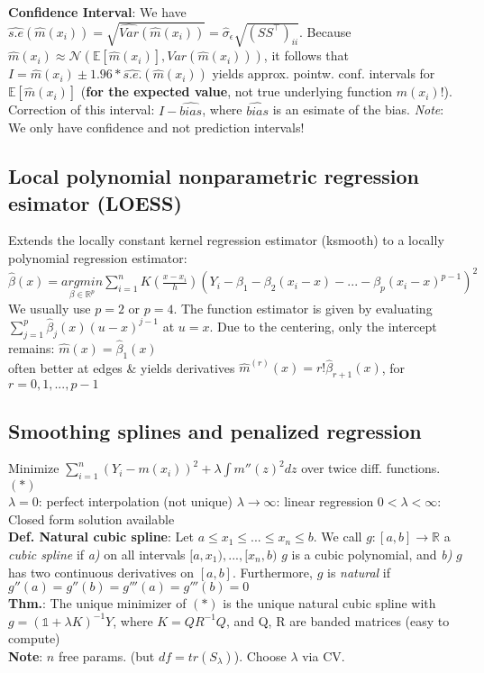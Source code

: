 \textbf{Confidence Interval}: We have $\widehat{s.e}(\hat{m}(x_i))=\sqrt{\widehat{Var}(\hat{m}(x_i))}=\hat\sigma_\epsilon\sqrt{(SS^\intercal )_{ii}}$. Because $\hat{m}(x_i) \approx \mathcal{N}(\mathbb{E}[\hat{m}(x_i)], Var(\hat{m}(x_i)))$, it follows that \\ 
$I = \hat{m}(x_i) \pm 1.96*\widehat{s.e.}(\hat{m}(x_i))$ yields approx. pointw. conf. intervals for $\mathbb{E}[\hat{m}(x_i)]$ (\textbf{for the expected value}, not true underlying function $m(x_i)$!). Correction of this interval: $I - \widehat{bias}$, where $\widehat{bias}$ is an esimate of the bias. \emph{Note}: We only have confidence and not prediction intervals!

\subsection*{Local polynomial nonparametric regression esimator (LOESS)}
Extends the locally constant kernel regression estimator (ksmooth) to a locally polynomial regression estimator:\\ 
$\hat{\beta}(x) = \underset{\beta \in \mathbb{R}^p}{argmin}\sum_{i=1}^n K\left(\frac{x-x_i}{h}\right)\left(Y_i - \beta_1 - \beta_2(x_i-x) - ... - \beta_p(x_i-x)^{p-1} \right)^2$ We usually use $p=2$ or $p=4$. The function estimator is given by evaluating $\sum_{j=1}^p \hat{\beta}_j(x)(u-x)^{j-1}$ at $u=x$. Due to the centering, only the intercept remains: $\hat{m}(x) = \hat{\beta}_1(x)$ \\
\textrightarrow often better at edges \& yields derivatives $\hat{m}^{(r)}(x) = r!\hat{\beta}_{r+1}(x)$, for $r=0,1,...,p-1$

\subsection*{Smoothing splines and penalized regression}
Minimize $\sum_{i=1}^n(Y_i-m(x_i))^2 + \lambda \int m''(z)^2dz$ over twice diff. functions. $(*)$\\
\textrightarrow $\lambda = 0$: perfect interpolation (not unique)
\textrightarrow $\lambda \to \infty$: linear regression
\textrightarrow $0 < \lambda < \infty$: Closed form solution available \\
\textbf{Def. Natural cubic spline}: Let $a \leq x_1 \leq ... \leq x_n \leq b.$ We call $g: [a, b] \to \mathbb{R}$ a \emph{cubic spline} if \emph{a)} on all intervals $[a, x_1), ...,[x_n, b)$ $g$ is a cubic polynomial, and \emph{b)} $g$ has two continuous derivatives on $[a,b]$. Furthermore, $g$ is \emph{natural} if $g''(a) = g''(b)=g'''(a)=g'''(b)=0$ \\
\textbf{Thm.}: The unique minimizer of $(*)$ is the unique natural cubic spline with $g = (\mathds{1}+\lambda K)^{-1}Y$, where $K=QR^{-1}Q$, and Q, R are banded matrices (easy to compute) \\
\textbf{Note}: $n$ free params. (but $df = tr(S_{\lambda})$). Choose $\lambda$ via CV. 